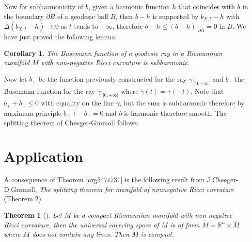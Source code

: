 \documentclass[11pt]{article}
\newtheorem{theorem}{Theorem}
\newtheorem{corollary}{Corollary}[theorem]
\begin{document}
Now for subharmonicity of \(b\), given a harmonic function \(h\) that coincides with \(b\) in the boundary \(\partial B\) of a
geodesic ball \(B\), then \(b-h\) is supported by \(b_{X,t} - h\) with \(\Delta (b_{X,t}-h) \to 0\) as \(t\)
tends to \(+\infty\), therefore \(b-h \leq (b-h)|_{\partial B} = 0\) in \(B\). We have just proved the
following lemma:

\begin{corollary}
The Busemann function of a geodesic ray in a Riemannian manifold \(M\) with non-negative Ricci
curvature is subharmonic.
\end{corollary}


Now let \(b_+\) be the function previously constructed for the ray \(\gamma|_{[0,+\infty[}\) and \(b_-\)
the Busemann function for the ray \(\tilde\gamma|_{[0,+\infty[}\) where \(\tilde\gamma(t) =
\gamma(-t)\). Note that \(b_+ + b_-\leq 0\) with equality on the line \(\gamma\), but the sum is
subharmonic therefore by maximum principle \(b_+ + -b_- = 0\) and \(b\) is harmonic therefore smooth. The
splitting theorem of Cheeger-Gromoll follows.


\section{Application}
\label{sec:org5127c58}
A consequence of Theorem \ref{org547c731} is the following result from J.Cheeger- D.Gromoll, \emph{The splitting
theorem for manifold of nonnegative Ricci curvature} (Theorem 2)
\begin{theorem}[]
\label{thm:decomp-Ricci-non-negative}
\label{org8a2f6bd}
Let \(M\) be a compact Riemannian manifold with non-negative Ricci curvature, then the universal
covering space of \(M\) is of form \(\tilde M = \mathbb{R}^n\times \bar M\) where \(\bar M\) does not contain
any lines. Then \(\bar M\) is compact.
\end{theorem}
\end{document}
